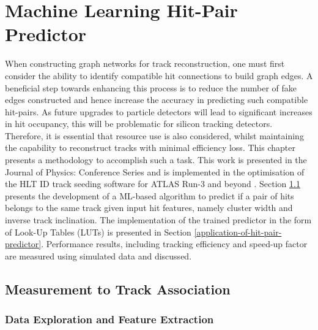 
\chapter{Machine Learning Hit-Pair Predictor} 
\label{chapter-4}



When constructing graph networks for track reconstruction, one must first consider the ability to identify compatible hit connections to build graph edges. A beneficial step towards enhancing this process is to reduce the number of fake edges constructed and hence increase the accuracy in predicting such compatible hit-pairs. As future upgrades to particle detectors will lead to significant increases in hit occupancy, this will be problematic for silicon tracking detectors. Therefore, it is essential that resource use is also considered, whilst maintaining the capability to reconstruct tracks with minimal efficiency loss. This chapter presents a methodology to accomplish such a task. This work is presented in the Journal of Physics: Conference Series \cite{Lad_2023} and is implemented in the optimisation of the HLT ID track seeding software for ATLAS Run-3 and beyond \cite{Grandi:2728111, Long:2813981}. Section \ref{measurement-to-track-association} presents the development of a ML-based algorithm to predict if a pair of hits belongs to the same track given input hit features, namely cluster width and inverse track inclination. The implementation of the trained predictor in the form of Look-Up Tables (LUTs) is presented in Section \ref{application-of-hit-pair-predictor}. Performance results, including tracking efficiency and speed-up factor are measured using simulated data and discussed.


\section{Measurement to Track Association}
\label{measurement-to-track-association}

\subsection{Data Exploration and Feature Extraction}

